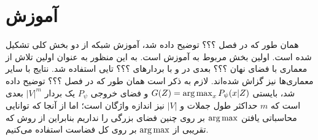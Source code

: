 \section{آموزش \wae{}}
همان طور که در فصل ؟؟؟ توضیح داده شد، آموزش شبکه از دو بخش کلی تشکیل شده است. اولین بخش مربوط به آموزش \wae{} است. به این منظور به عنوان اولین تلاش از معماری \transformer{} با فضای نهان ؟؟؟ بعدی در \encoder{} و \decoder{} با بردارهای  \embedding{} ؟؟؟ تایی استفاده شد. نتایج با سایر معماری‌ها نیز گزاش شده‌اند. لازم به ذکر است همان طور که در فصل ؟؟؟ توضیح داده شد، \decoder{} بایستی 
$G(Z) = \operatorname*{arg\,max}_{x} P_\psi(x|Z)$
و فضای خروجی $P_\psi$ یک بردار $|V|^{m}$ بعدی است که $m$ حداکثر طول جملات و $|V|$ نیز اندازه واژگان است؛ اما از آنجا که توانایی محاسباتی یافتن $\operatorname*{arg\,max}$ بر روی چنین فضای بزرگی را نداریم بنابراین از روش 
که تقریبی از $\operatorname*{arg\,max}$ بر روی کل فضاست استفاده می‌کنیم.
\iffalse
